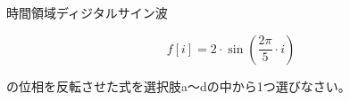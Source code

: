 時間領域ディジタルサイン波 

\[
f[i] = 2 \cdot \sin \left ( \frac{2 \pi}{5}  \cdot i \right )
\]

\noindent の位相を反転させた式を選択肢a〜dの中から1つ選びなさい。
